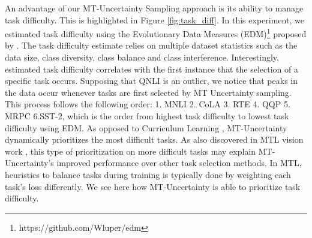 \documentclass{article} \usepackage{iclr2021_conference,times}
\begin{document}
An advantage of our MT-Uncertainty Sampling approach is its ability to manage task difficulty. This is highlighted in Figure \ref{fig:task_diff}. In this experiment, we estimated task difficulty using the Evolutionary Data Measures (EDM)\footnote{https://github.com/Wluper/edm} proposed by \citet{collins-etal-2018-evolutionary}. The task difficulty estimate relies on multiple dataset statistics such as the data size, class diversity, class balance and class interference. Interestingly, estimated task difficulty correlates with the first instance that the selection of a specific task occurs. Supposing that QNLI is an outlier, we notice that peaks in the data occur whenever tasks are first selected by MT Uncertainty sampling. This process follows the following order: 1. MNLI 2. CoLA 3. RTE 4. QQP 5. MRPC 6.SST-2, which is the order from highest task difficulty to lowest task difficulty using EDM. As opposed to Curriculum Learning \citep{bengio2009curriculum}, MT-Uncertainty dynamically prioritizes the most difficult tasks. As also discovered in MTL vision work \citep{Guo_2018_ECCV}, this type of prioritization on more difficult tasks may explain MT-Uncertainty's improved performance over other task selection methods. In MTL, heuristics to balance tasks during training is typically done by weighting each task's loss differently. We see here how MT-Uncertainty is able to prioritize task difficulty.
\end{document}

